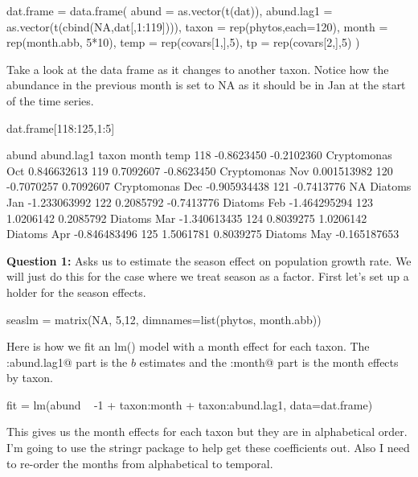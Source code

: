 \begin{Schunk}
\begin{Sinput}
 dat.frame = data.frame(
   abund = as.vector(t(dat)),
   abund.lag1 = as.vector(t(cbind(NA,dat[,1:119]))),
   taxon = rep(phytos,each=120),
   month = rep(month.abb, 5*10),
   temp = rep(covars[1,],5),
   tp = rep(covars[2,],5)
 )
\end{Sinput}
\end{Schunk}

Take a look at the data frame as it changes to another taxon.  Notice how the abundance in the previous month is set to NA as it should be in Jan at the start of the time series.
\begin{Schunk}
\begin{Sinput}
 dat.frame[118:125,1:5]
\end{Sinput}
\begin{Soutput}
         abund abund.lag1       taxon month         temp
118 -0.8623450 -0.2102360 Cryptomonas   Oct  0.846632613
119  0.7092607 -0.8623450 Cryptomonas   Nov  0.001513982
120 -0.7070257  0.7092607 Cryptomonas   Dec -0.905934438
121 -0.7413776         NA     Diatoms   Jan -1.233063992
122  0.2085792 -0.7413776     Diatoms   Feb -1.464295294
123  1.0206142  0.2085792     Diatoms   Mar -1.340613435
124  0.8039275  1.0206142     Diatoms   Apr -0.846483496
125  1.5061781  0.8039275     Diatoms   May -0.165187653
\end{Soutput}
\end{Schunk}

\bigskip
{\bf Question 1:} Asks us to estimate the season effect on population growth rate.    We will just do this for the case where we treat season as a factor.  First let's set up a holder for the season effects.

\begin{Schunk}
\begin{Sinput}
 seaslm = matrix(NA, 5,12, dimnames=list(phytos, month.abb))
\end{Sinput}
\end{Schunk}

Here is how we fit an lm() model with a month effect for each taxon.  The \verb@taxon:abund.lag1@ part is the $b$ estimates and the \verb@taxon:month@ part is the month effects by taxon.
\begin{Schunk}
\begin{Sinput}
 fit = lm(abund ~ -1 + taxon:month + taxon:abund.lag1, data=dat.frame)
\end{Sinput}
\end{Schunk}
This gives us the month effects for each taxon but they are in alphabetical order.  I'm going to use the stringr package to help get these coefficients out.  Also I need to re-order the months from alphabetical to temporal.

